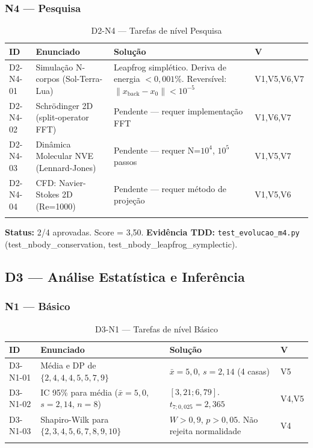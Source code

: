 \documentclass[12pt,a4paper,oneside]{article}
\begin{document}
\subsubsection{N4 — Pesquisa}

\begin{longtable}{p{}p{}p{}p{}}
\toprule
\textbf{ID} & \textbf{Enunciado} & \textbf{Solução} & \textbf{V} \\
\midrule
D2-N4-01 & Simulação N-corpos (Sol-Terra-Lua) & Leapfrog simplético. Deriva de energia $<0{,}001\%$. Reversível: $\|x_{\text{back}}-x_0\|<10^{-5}$ & V1,V5,V6,V7 \\
D2-N4-02 & Schrödinger 2D (split-operator FFT) & Pendente — requer implementação FFT & V1,V6,V7 \\
D2-N4-03 & Dinâmica Molecular NVE (Lennard-Jones) & Pendente — requer N=$10^4$, $10^5$ passos & V1,V5,V7 \\
D2-N4-04 & CFD: Navier-Stokes 2D (Re=1000) & Pendente — requer método de projeção & V1,V5,V6 \\
\bottomrule
\caption{D2-N4 — Tarefas de nível Pesquisa}
\end{longtable}

\textbf{Status:} 2/4 aprovadas. Score = 3,50. \textbf{Evidência TDD:}
\texttt{test\_evolucao\_m4.py} (test\_nbody\_conservation, test\_nbody\_leapfrog\_symplectic).

\subsection{D3 — Análise Estatística e Inferência}

\subsubsection{N1 — Básico}

\begin{longtable}{p{}p{}p{}p{}}
\toprule
\textbf{ID} & \textbf{Enunciado} & \textbf{Solução} & \textbf{V} \\
\midrule
D3-N1-01 & Média e DP de $\{2,4,4,4,5,5,7,9\}$ & $\bar{x}=5{,}0$, $s=2{,}14$ (4 casas) & V5 \\
D3-N1-02 & IC 95\% para média ($\bar{x}=5{,}0$, $s=2{,}14$, $n=8$) & $[3{,}21; 6{,}79]$. $t_{7;0{,}025}=2{,}365$ & V4,V5 \\
D3-N1-03 & Shapiro-Wilk para $\{2,3,4,5,6,7,8,9,10\}$ & $W>0{,}9$, $p>0{,}05$. Não rejeita normalidade & V4 \\
\bottomrule
\caption{D3-N1 — Tarefas de nível Básico}
\end{longtable}
\end{document}
